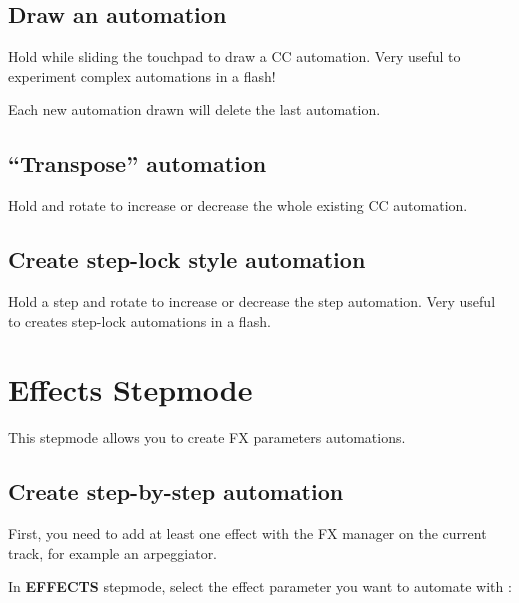 \subsection{Draw an automation}

Hold  while sliding the touchpad to draw a CC automation. Very useful to experiment complex automations in a flash!


Each new automation drawn will delete the last automation.

\subsection{“Transpose” automation}

Hold  and rotate \encodericon{} to increase or decrease the whole existing CC automation.

\subsection{Create step-lock style automation}

Hold a step \padsicon{} and rotate \encodericon{} to increase or decrease the step automation. Very useful to creates step-lock automations in a flash.



\section{Effects Stepmode}

This stepmode allows you to create FX parameters automations.

\subsection{Create step-by-step automation}

First, you need to add at least one effect with the FX manager on the current track, for example an arpeggiator.

In \textbf{EFFECTS} stepmode, select the effect parameter you want to automate with \encodericon{}:



